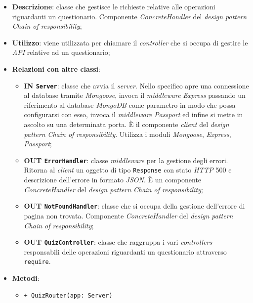 	\begin{itemize}
		\item \textbf{Descrizione}: classe che gestisce le richieste relative alle operazioni riguardanti un questionario. Componente \textit{ConcreteHandler} del \textit{design pattern} \textit{Chain of responsibility};
		\item \textbf{Utilizzo}: viene utilizzata per chiamare il \textit{controller} che si occupa di gestire le \textit{API} relative ad un questionario;
		\item \textbf{Relazioni con altre classi}:
		\begin{itemize}
		\item \textbf{IN \texttt{Server}}: classe che avvia il \textit{server}. Nello specifico apre una connessione al database tramite \textit{Mongoose}, invoca il \textit{middleware} \textit{Express} passando un riferimento al database \textit{MongoDB} come parametro in modo che possa configurarsi con esso, invoca il \textit{middleware} \textit{Passport} ed infine si mette in ascolto su una determinata porta. È il componente \textit{client} del \textit{design pattern} \textit{Chain of responsibility}. Utilizza i moduli \textit{Mongoose}, \textit{Express}, \textit{Passport};
		\item \textbf{OUT \texttt{ErrorHandler}}: classe \textit{middleware} per la gestione degli errori. Ritorna al \textit{client} un oggetto di tipo \texttt{Response} con stato \textit{HTTP} 500 e descrizione dell'errore in formato \textit{JSON}. È un componente \textit{ConcreteHandler} del \textit{design pattern} \textit{Chain of responsibility};
		\item \textbf{OUT \texttt{NotFoundHandler}}: classe che si occupa della gestione dell'errore di pagina non trovata. Componente \textit{ConcreteHandler} del \textit{design pattern} \textit{Chain of responsibility};
		\item \textbf{OUT \texttt{QuizController}}: classe che raggruppa i vari \textit{controllers} responsabili delle operazioni riguardanti un questionario attraverso \texttt{require}.
		\end{itemize}
		\item \textbf{Metodi}:
		\begin{itemize}
		\item \texttt{+ QuizRouter(app: Server)} \\

\end{itemize}
\end{itemize}
